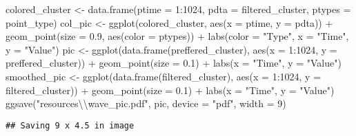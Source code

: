 \documentclass[
]{article}
\newenvironment{Shaded}{\begin{snugshade}}{\end{snugshade}}
\newcommand{\AttributeTok}[1]{\textcolor[rgb]{0.77,0.63,0.00}{#1}}
\newcommand{\DecValTok}[1]{\textcolor[rgb]{0.00,0.00,0.81}{#1}}
\newcommand{\FloatTok}[1]{\textcolor[rgb]{0.00,0.00,0.81}{#1}}
\newcommand{\FunctionTok}[1]{\textcolor[rgb]{0.00,0.00,0.00}{#1}}
\newcommand{\NormalTok}[1]{#1}
\newcommand{\OtherTok}[1]{\textcolor[rgb]{0.56,0.35,0.01}{#1}}
\newcommand{\SpecialCharTok}[1]{\textcolor[rgb]{0.00,0.00,0.00}{#1}}
\newcommand{\StringTok}[1]{\textcolor[rgb]{0.31,0.60,0.02}{#1}}
\begin{document}
\begin{Shaded}
\begin{Highlighting}[]
\NormalTok{colored\_cluster }\OtherTok{\textless{}{-}} \FunctionTok{data.frame}\NormalTok{(}\AttributeTok{ptime =} \DecValTok{1}\SpecialCharTok{:}\DecValTok{1024}\NormalTok{, }\AttributeTok{pdta =}\NormalTok{ filtered\_cluster, }\AttributeTok{ptypes =}\NormalTok{ point\_type)}
\NormalTok{col\_pic }\OtherTok{\textless{}{-}} \FunctionTok{ggplot}\NormalTok{(colored\_cluster, }\FunctionTok{aes}\NormalTok{(}\AttributeTok{x =}\NormalTok{ ptime, }\AttributeTok{y =}\NormalTok{ pdta)) }\SpecialCharTok{+} \FunctionTok{geom\_point}\NormalTok{(}\AttributeTok{size =} \FloatTok{0.9}\NormalTok{, }
    \FunctionTok{aes}\NormalTok{(}\AttributeTok{color =}\NormalTok{ ptypes)) }\SpecialCharTok{+} \FunctionTok{labs}\NormalTok{(}\AttributeTok{color =} \StringTok{"Type"}\NormalTok{, }\AttributeTok{x =} \StringTok{"Time"}\NormalTok{, }\AttributeTok{y =} \StringTok{"Value"}\NormalTok{)}
\NormalTok{pic }\OtherTok{\textless{}{-}} \FunctionTok{ggplot}\NormalTok{(}\FunctionTok{data.frame}\NormalTok{(preffered\_cluster), }\FunctionTok{aes}\NormalTok{(}\AttributeTok{x =} \DecValTok{1}\SpecialCharTok{:}\DecValTok{1024}\NormalTok{, }\AttributeTok{y =}\NormalTok{ preffered\_cluster)) }\SpecialCharTok{+} 
    \FunctionTok{geom\_point}\NormalTok{(}\AttributeTok{size =} \FloatTok{0.1}\NormalTok{) }\SpecialCharTok{+} \FunctionTok{labs}\NormalTok{(}\AttributeTok{x =} \StringTok{"Time"}\NormalTok{, }\AttributeTok{y =} \StringTok{"Value"}\NormalTok{)}
\NormalTok{smoothed\_pic }\OtherTok{\textless{}{-}} \FunctionTok{ggplot}\NormalTok{(}\FunctionTok{data.frame}\NormalTok{(filtered\_cluster), }\FunctionTok{aes}\NormalTok{(}\AttributeTok{x =} \DecValTok{1}\SpecialCharTok{:}\DecValTok{1024}\NormalTok{, }\AttributeTok{y =}\NormalTok{ filtered\_cluster)) }\SpecialCharTok{+} 
    \FunctionTok{geom\_point}\NormalTok{(}\AttributeTok{size =} \FloatTok{0.1}\NormalTok{) }\SpecialCharTok{+} \FunctionTok{labs}\NormalTok{(}\AttributeTok{x =} \StringTok{"Time"}\NormalTok{, }\AttributeTok{y =} \StringTok{"Value"}\NormalTok{)}
\FunctionTok{ggsave}\NormalTok{(}\StringTok{"resources}\SpecialCharTok{\textbackslash{}\textbackslash{}}\StringTok{wave\_pic.pdf"}\NormalTok{, pic, }\AttributeTok{device =} \StringTok{"pdf"}\NormalTok{, }\AttributeTok{width =} \DecValTok{9}\NormalTok{)}
\end{Highlighting}
\end{Shaded}

\begin{verbatim}
## Saving 9 x 4.5 in image
\end{verbatim}
\end{document}
